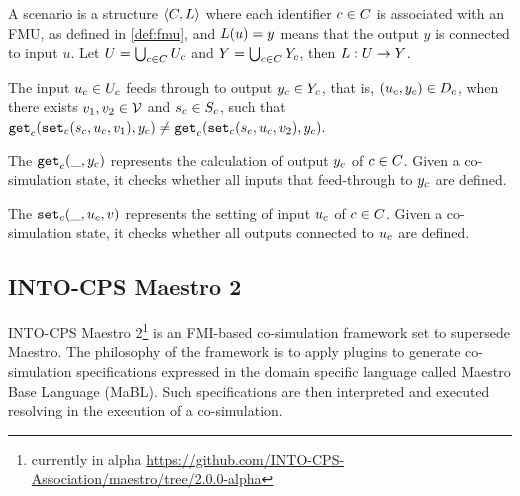 \documentclass[runningheads]{llncs}
\begin{document}
\begin{definition}[Scenario]\label{def:cosim_scenario}
  A scenario is a structure $ \left\langle C, L \right\rangle $ where each identifier $c \in C$ is associated with an FMU, as defined in \ref{def:fmu}, and $L(u)=y$ means that the output $y$ is connected to input $u$.
  Let $U = \bigcup_{c \in C} U_{c}$ and $Y = \bigcup_{c \in C} Y_{c}$, then $L : U \to Y$.
\end{definition}

\begin{definition}\label{def:feedthrough}
  The input $u_{c} \in U_{c}$ feeds through to output $y_{c} \in Y_{c}$, that is, $(u_{c},y_{c}) \in D_{c}$, when there exists $v_1, v_2 \in \mathcal{V}$ and $s_{c} \in S_{c}$, such that
  $
  \mathtt{get}_{c} (\mathtt{set}_{c}(s_{c}, u_{c}, v_1), y_{c}) \neq \mathtt{get}_{c} (\mathtt{set}_{c}(s_{c}, u_{c}, v_2), y_{c}).
  $
\end{definition}

\begin{definition}\label{def:getout}
The $\mathtt{get}_{c}(\_, y_{c})$ represents the calculation of output $y_{c}$ of $c \in C$. Given a co-simulation state, it checks whether all inputs that feed-through to $y_{c}$ are defined.
\end{definition}

\begin{definition}\label{def:setin}
The $\mathtt{set}_{c}(\_, u_{c}, v)$ represents the setting of input $u_{c}$  of $c \in C$. Given a co-simulation state, it checks whether all outputs connected to $u_{c}$ are defined.
\end{definition}

\subsection{INTO-CPS Maestro 2}
INTO-CPS Maestro 2\footnote{currently in alpha \url{https://github.com/INTO-CPS-Association/maestro/tree/2.0.0-alpha}}\cite{thule_maestro2_2019} is an FMI-based co-simulation framework set to supersede Maestro\cite{Maestro}. The philosophy of the framework is to apply plugins to generate co-simulation specifications expressed in the domain specific language called Maestro Base Language (MaBL). Such specifications are then interpreted and executed resolving in the execution of a co-simulation.
\end{document}

